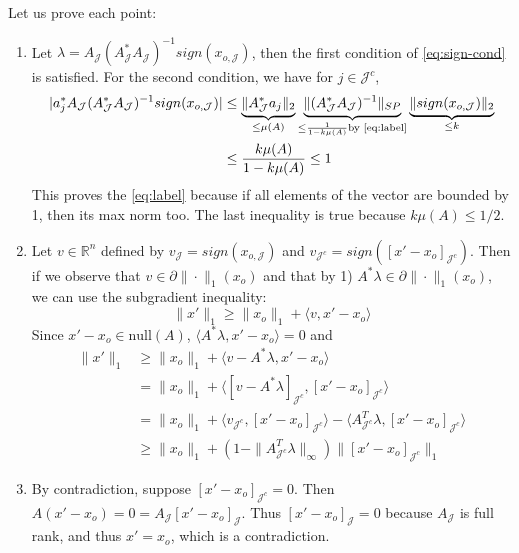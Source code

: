 \documentclass[12pt, openany]{report}
\newcommand{\R}{\mathbb{R}}
\theoremstyle{definition}
\begin{document}
Let us prove each point:
\begin{enumerate}
	\item Let $\lambda = A_\mathcal{J} (A_\mathcal{J}^*A_\mathcal{J})^{-1} sign(x_{o,\mathcal{J}})$, then the first condition of \eqref{eq:sign-cond} is satisfied. For the second condition, we have for $j \in \mathcal{J}^c$, 
	\begin{equation}
		\begin{aligned}
			|a_j^* A_\mathcal{J} (A_\mathcal{J}^*A_\mathcal{J})^{-1} sign(x_{o,\mathcal{J}})| &\leq \underbrace{\|A_\mathcal{J}^* a_j\|_2}_{\le \mu(A)} \underbrace{\|(A_\mathcal{J}^*A_\mathcal{J})^{-1}\|_{SP}}_{\le \frac{1}{1-k\mu(A)} \text{by \eqref{eq:label}}} \underbrace{\|sign(x_{o,\mathcal{J}})\|_2}_{\le k}\\
			&\leq \frac{k \mu(A)}{1- k \mu(A)} \leq 1 
		\end{aligned}
	\end{equation}
	This proves the \eqref{eq:label} because if all elements of the vector are bounded by 1, then its max norm too. The last inequality is true because $k\mu(A) \leq 1/2$.
	\item Let $v \in \R^{n}$ defined by $v_\mathcal{J} = sign(x_{o,\mathcal{J}})$ and $v_{\mathcal{J}^c} = sign([x'-x_o]_{\mathcal{J}^c})$. Then if we observe that $v \in \partial \|\cdot\|_1 (x_o)$ and that by 1) $A^* \lambda \in \partial \|\cdot\|_1 (x_o)$, we can use the subgradient inequality:
	\begin{equation}
		\|x'\|_1 \ge \|x_o\|_1 + \langle v,x'-x_o\rangle
	\end{equation}
	Since $x'-x_o\in \text{null}(A)$, $\langle A^*\lambda, x'-x_o\rangle = 0$ and 
	\begin{equation}
		\begin{aligned}
			\|x'\|_1 &\geq \|x_o\|_1 + \langle v - A^* \lambda, x'-x_o\rangle\\
			&= \|x_o\|_1 + \langle [v - A^* \lambda]_{\mathcal{J}^c}, [x'-x_o]_{\mathcal{J}^c}\rangle\\
			&= \|x_o\|_1 + \langle v_{\mathcal{J}^c}, [x'-x_o]_{\mathcal{J}^c}\rangle - \langle A_{\mathcal{J}^c}^T \lambda, [x'-x_o]_{\mathcal{J}^c}\rangle\\
			&\geq \|x_o\|_1 + (1-\|A_{\mathcal{J}^c}^T \lambda\|_\infty) \|[x'-x_o]_{\mathcal{J}^c}\|_1
		\end{aligned}
	\end{equation}
	\item By contradiction, suppose $[x'-x_o]_{\mathcal{J}^c} = 0$. Then $A(x' - x_o) = 0 = A_\mathcal{J} [x'-x_o]_\mathcal{J}$. Thus $[x'-x_o]_\mathcal{J} = 0$ because $A_\mathcal{J}$ is full rank, and thus $x' = x_o$, which is a contradiction.
\end{enumerate}
\end{document}
